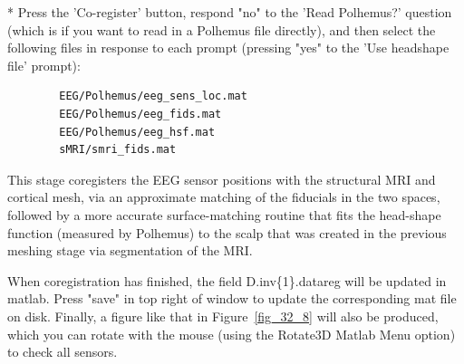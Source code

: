 * Press the 'Co-register' button, respond "no" to the 'Read Polhemus?' question (which is if you want to read in a Polhemus file directly), and then select the following files in response to each prompt (pressing "yes" to the 'Use headshape file' prompt):
\begin{verbatim}
  		EEG/Polhemus/eeg_sens_loc.mat
   		EEG/Polhemus/eeg_fids.mat
   		EEG/Polhemus/eeg_hsf.mat
   		sMRI/smri_fids.mat
\end{verbatim}
This stage coregisters the EEG sensor positions with the structural MRI and cortical mesh, via an approximate matching of the fiducials in the two spaces, followed by a more accurate surface-matching routine that fits the head-shape function (measured by Polhemus) to the scalp that was created in the previous meshing stage via segmentation of the MRI.

When coregistration has finished, the field D.inv\{1\}.datareg will be updated in matlab. Press "save" in top right of window to update the corresponding mat file on disk. Finally, a figure like that in Figure~\ref{fig_32_8} will also be produced, which you can rotate with the mouse (using the Rotate3D Matlab Menu option) to check all sensors.



